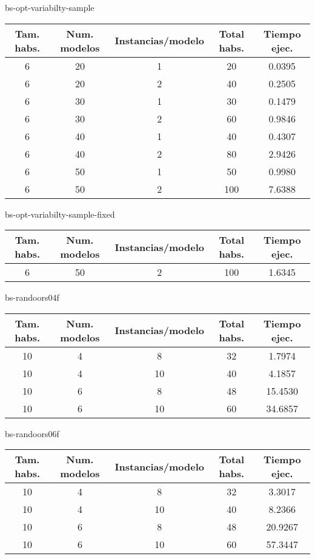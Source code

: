 bs-opt-variabilty-sample
\begin{center}
	\begin{tabular}{ | c | c | c | c | c | }
\hline
Tam. habs. & Num. modelos & Instancias/modelo & Total habs. & Tiempo ejec. \\ \hline 
6 & 20 & 1 & 20 & 0.0395 \\ 
6 & 20 & 2 & 40 & 0.2505 \\ 
6 & 30 & 1 & 30 & 0.1479 \\ 
6 & 30 & 2 & 60 & 0.9846 \\ 
6 & 40 & 1 & 40 & 0.4307 \\ 
6 & 40 & 2 & 80 & 2.9426 \\ 
6 & 50 & 1 & 50 & 0.9980 \\ 
6 & 50 & 2 & 100 & 7.6388 \\ 
\hline
	\end{tabular}
\end{center}

bs-opt-variabilty-sample-fixed
\begin{center}
	\begin{tabular}{ | c | c | c | c | c | }
\hline
Tam. habs. & Num. modelos & Instancias/modelo & Total habs. & Tiempo ejec. \\ \hline 
6 & 50 & 2 & 100 & 1.6345 \\ 
\hline
	\end{tabular}
\end{center}

bs-randoors04f
\begin{center}
	\begin{tabular}{ | c | c | c | c | c | }
\hline
Tam. habs. & Num. modelos & Instancias/modelo & Total habs. & Tiempo ejec. \\ \hline 
10 & 4 & 8 & 32 & 1.7974 \\ 
10 & 4 & 10 & 40 & 4.1857 \\ 
10 & 6 & 8 & 48 & 15.4530 \\ 
10 & 6 & 10 & 60 & 34.6857 \\ 
\hline
	\end{tabular}
\end{center}

bs-randoors06f
\begin{center}
	\begin{tabular}{ | c | c | c | c | c | }
\hline
Tam. habs. & Num. modelos & Instancias/modelo & Total habs. & Tiempo ejec. \\ \hline 
10 & 4 & 8 & 32 & 3.3017 \\ 
10 & 4 & 10 & 40 & 8.2366 \\ 
10 & 6 & 8 & 48 & 20.9267 \\ 
10 & 6 & 10 & 60 & 57.3447 \\ 
\hline
	\end{tabular}
\end{center}

